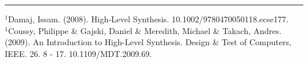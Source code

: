 \documentclass[11pt]{article}
\begin{document}
\\\\
\begin{center}
    \rule{\textwidth}{1pt}
\end{center}
$^1$Damaj, Issam. (2008). High‐Level Synthesis. 10.1002/9780470050118.ecse177. \\
$^1$Coussy, Philippe \& Gajski, Daniel \& Meredith, Michael \& Takach, Andres. (2009). An Introduction to High-Level Synthesis. Design \& Test of Computers, IEEE. 26. 8 - 17. 10.1109/MDT.2009.69. 
\end{document}
